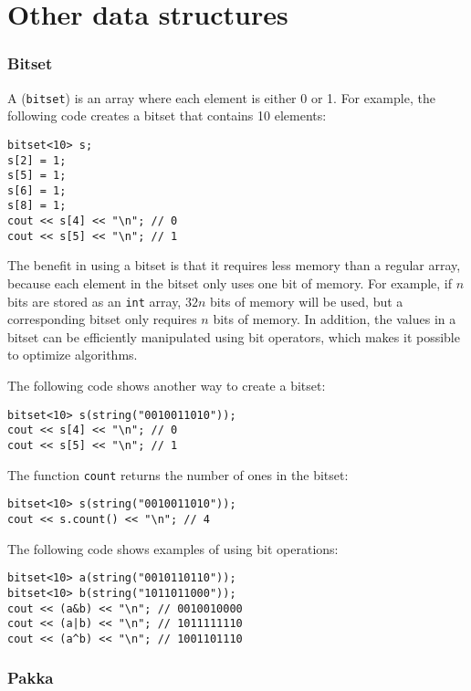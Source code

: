 \section{Other data structures}

\subsubsection{Bitset}


A  (\texttt{bitset}) is an array
where each element is either 0 or 1.
For example, the following code creates
a bitset that contains 10 elements:
\begin{lstlisting}
bitset<10> s;
s[2] = 1;
s[5] = 1;
s[6] = 1;
s[8] = 1;
cout << s[4] << "\n"; // 0
cout << s[5] << "\n"; // 1
\end{lstlisting}

The benefit in using a bitset is that
it requires less memory than a regular array,
because each element in the bitset only
uses one bit of memory.
For example, 
if $n$ bits are stored as an \texttt{int} array,
$32n$ bits of memory will be used,
but a corresponding bitset only requires $n$ bits of memory.
In addition, the values in a bitset
can be efficiently manipulated using
bit operators, which makes it possible to
optimize algorithms.

The following code shows another way to create a bitset:
\begin{lstlisting}
bitset<10> s(string("0010011010"));
cout << s[4] << "\n"; // 0
cout << s[5] << "\n"; // 1
\end{lstlisting}

The function \texttt{count} returns the number
of ones in the bitset:

\begin{lstlisting}
bitset<10> s(string("0010011010"));
cout << s.count() << "\n"; // 4
\end{lstlisting}

The following code shows examples of using bit operations:
\begin{lstlisting}
bitset<10> a(string("0010110110"));
bitset<10> b(string("1011011000"));
cout << (a&b) << "\n"; // 0010010000
cout << (a|b) << "\n"; // 1011111110
cout << (a^b) << "\n"; // 1001101110
\end{lstlisting}

\subsubsection{Pakka}

